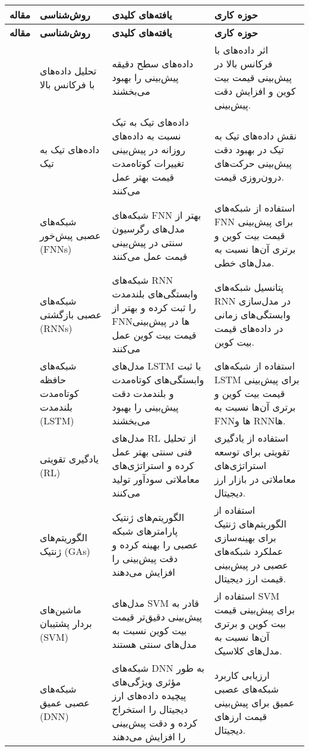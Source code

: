 {\begin{longtable}{|c|p{1.5cm}|p{4cm}|p{3.5cm}|}
	\hline
	\textbf{مقاله} & \textbf{روش‌شناسی} & \textbf{یافته‌های کلیدی} & \textbf{حوزه کاری} \\
	\hline
	\endfirsthead
	\hline
	\textbf{مقاله} & \textbf{روش‌شناسی} & \textbf{یافته‌های کلیدی} & \textbf{حوزه کاری} \\
	\hline
	\endhead
	\hline
	\endfoot
	\hline
	\cite{author1} & تحلیل داده‌های با فرکانس بالا & داده‌های سطح دقیقه پیش‌بینی را بهبود می‌بخشند & اثر داده‌های با فرکانس بالا در پیش‌بینی قیمت بیت کوین و افزایش دقت پیش‌بینی. \\
	\hline
	\cite{author2} & داده‌های تیک به تیک & داده‌های تیک به تیک نسبت به داده‌های روزانه در پیش‌بینی تغییرات کوتاه‌مدت قیمت بهتر عمل می‌کنند & نقش داده‌های تیک به تیک در بهبود دقت پیش‌بینی حرکت‌های درون‌روزی قیمت. \\
	\hline
	\cite{author3} & شبکه‌های عصبی پیش‌خور (FNNs) & شبکه‌های FNN بهتر از مدل‌های رگرسیون سنتی در پیش‌بینی قیمت عمل می‌کنند & استفاده از شبکه‌های FNN برای پیش‌بینی قیمت بیت کوین و برتری آن‌ها نسبت به مدل‌های خطی. \\
	\hline
	\cite{author4} & شبکه‌های عصبی بازگشتی (RNNs) & شبکه‌های RNN وابستگی‌های بلندمدت را ثبت کرده و بهتر از FNNها در پیش‌بینی قیمت بیت کوین عمل می‌کنند & پتانسیل شبکه‌های RNN در مدل‌سازی وابستگی‌های زمانی در داده‌های قیمت بیت کوین. \\
	\hline
	\cite{author5} & شبکه‌های حافظه کوتاه‌مدت بلندمدت (LSTM) & مدل‌های LSTM با ثبت وابستگی‌های کوتاه‌مدت و بلندمدت دقت پیش‌بینی را بهبود می‌بخشند & استفاده از شبکه‌های LSTM برای پیش‌بینی قیمت بیت کوین و برتری آن‌ها نسبت به FNNها و RNNها. \\
	\hline
	\cite{author6} & یادگیری تقویتی (RL) & مدل‌های RL از تحلیل فنی سنتی بهتر عمل کرده و استراتژی‌های معاملاتی سودآور تولید می‌کنند & استفاده از یادگیری تقویتی برای توسعه استراتژی‌های معاملاتی در بازار ارز دیجیتال. \\
	\hline
	\cite{author7} & الگوریتم‌های ژنتیک (GAs) & الگوریتم‌های ژنتیک پارامترهای شبکه عصبی را بهینه کرده و دقت پیش‌بینی را افزایش می‌دهند & استفاده از الگوریتم‌های ژنتیک برای بهینه‌سازی عملکرد شبکه‌های عصبی در پیش‌بینی قیمت ارز دیجیتال. \\
	\hline
	\cite{author8} & ماشین‌های بردار پشتیبان (SVM) & مدل‌های SVM قادر به پیش‌بینی دقیق‌تر قیمت بیت کوین نسبت به مدل‌های سنتی هستند & استفاده از SVM برای پیش‌بینی قیمت بیت کوین و برتری آن‌ها نسبت به مدل‌های کلاسیک. \\
	\hline
	\cite{author9} & شبکه‌های عصبی عمیق (DNN) & شبکه‌های DNN به طور مؤثری ویژگی‌های پیچیده داده‌های ارز دیجیتال را استخراج کرده و دقت پیش‌بینی را افزایش می‌دهند & ارزیابی کاربرد شبکه‌های عصبی عمیق برای پیش‌بینی قیمت ارزهای دیجیتال. \\

\end{longtable}}
